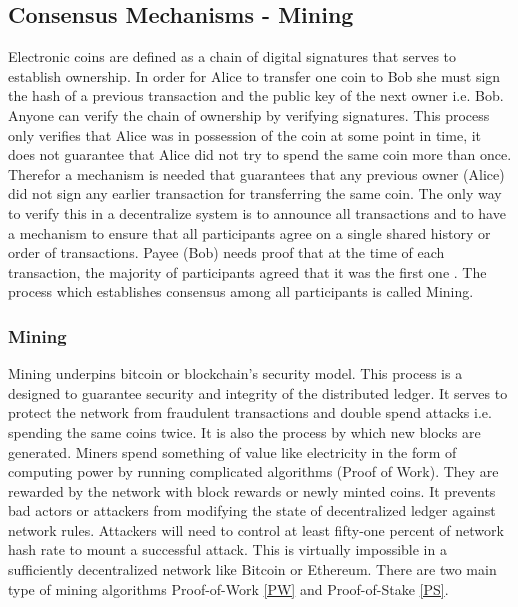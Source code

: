 \subsection{Consensus Mechanisms - Mining} \label{Mining}
Electronic coins are defined as a chain of digital signatures that serves to establish ownership. In order for Alice to transfer one coin to Bob she must sign the hash of a previous transaction and the public key of the next owner i.e. Bob. Anyone can verify the chain of ownership by verifying signatures. This process only verifies that Alice was in possession of the coin at some point in time, it does not guarantee that Alice did not try to spend the same coin more than once.  Therefor a mechanism is needed that guarantees that any previous owner (Alice) did not sign any earlier transaction for transferring the same coin. The only way to verify this in a decentralize system is to announce all transactions and to have a mechanism to ensure that all participants agree on a single shared history or order of transactions. Payee (Bob) needs proof that at the time of each transaction, the majority of participants agreed that it was the first one \cite{paper:001}. The process which establishes consensus among all participants is called Mining.
\subsubsection{Mining}
Mining underpins bitcoin or blockchain’s security model. This process is a designed to guarantee security and integrity of the distributed ledger. It serves to protect the network from fraudulent transactions and double spend attacks i.e. spending the same coins twice. It is also the process by which new blocks are generated. Miners spend something of value like electricity in the form of computing power by running complicated algorithms (Proof of Work). They are rewarded by the network with block rewards or newly minted coins. It prevents bad actors or attackers from modifying the state of decentralized ledger against network rules. Attackers will need to control at least fifty-one percent of network hash rate to mount a successful attack. This is virtually impossible in a sufficiently decentralized network like Bitcoin or Ethereum. There are two main type of mining algorithms Proof-of-Work \ref{PW} and Proof-of-Stake \ref{PS}.
  
